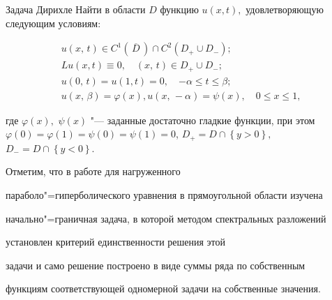 \begin{newthm}{Задача Дирихле} Найти в области $D$ функцию $u(x, t),$ удовлетворяющую следующим условиям\/{\rm :}

\begin{gather}

\label{arkhip:eq2} u\left( {x,\,t} \right) \in C^{1}\left(\, \overline

{D}\, \right)\cap C^{2}\left(D_{+} \cup D_{-}\right);

\\

\label{arkhip:eq3} Lu(x, t) \equiv 0,\quad ( x,\,t) \in D_{+} \cup D_{-} ;

\\

\label{arkhip:eq4} u\left( {0,\,t} \right) = u(1, t) = 0,

\quad {-\alpha \leq{t} \leq{\beta}};

\\

\label{arkhip:eq5} u\left( {x,\, \beta} \right) = \varphi (x), u(x,\,-\alpha) = \psi(x),

\quad {0\leq{x}\leq{1}},

\end{gather}

где $\varphi (x),$ $\psi \left( {x}

\right)$ "--- заданные достаточно гладкие функции{\rm ,} при этом $\varphi

\left( {0} \right) = \varphi\left( {1}\right) = \psi \left( {0}

\right) = \psi\left( {1}\right)=0$, $D_{+} = D \cap \left\{{y>0}\right\},$ $D_{-} = D \cap \left\{ {y<0}\right\}.$

\end{newthm}



\smallskip



Отметим, что в работе \cite{arh:1} для нагруженного

параболо"=гиперболического уравнения в прямоугольной области изучена

начально"=граничная задача, в которой методом спектральных разложений

\cite{arh:2} установлен критерий единственности решения этой

задачи и само решение построено в виде суммы ряда по собственным

функциям соответствующей одномерной задачи на собственные значения.



